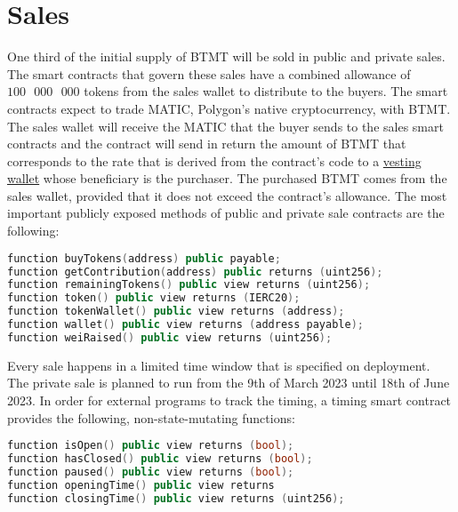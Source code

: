 \documentclass[a4paper,12pt]{article}
\begin{document}
\section{Sales}

One third of the initial supply of BTMT will be sold in public and private sales.
The smart contracts that govern these sales have a combined allowance
of $100\text{ }000\text{ }000$ tokens from the sales wallet to distribute to the buyers.
The smart contracts expect to trade MATIC, Polygon's native cryptocurrency, with BTMT.
The sales wallet will receive the MATIC that the buyer sends to the sales
smart contracts and the contract will send in return the amount of BTMT that
corresponds to the rate that is derived from the contract's code to a \href{https://github.com/OpenZeppelin/openzeppelin-contracts/blob/master/contracts/finance/VestingWallet.sol}{vesting wallet} whose beneficiary is the purchaser. The purchased BTMT comes from the sales wallet,
provided that it does not exceed the contract's allowance.
The most important publicly exposed methods of public and private
sale contracts
are the following:

\begin{lstlisting}[language=C++, caption=Solidity sale function signatures]
function buyTokens(address) public payable;
function getContribution(address) public returns (uint256);
function remainingTokens() public view returns (uint256);
function token() public view returns (IERC20);
function tokenWallet() public view returns (address);
function wallet() public view returns (address payable);
function weiRaised() public view returns (uint256);
\end{lstlisting}

Every sale happens in a limited time window that is specified on deployment.
The private sale is planned to run from the 9th of March 2023 until 18th of June 2023.
In order for external programs to track the timing, a
timing smart contract
provides the following, non-state-mutating functions:
\begin{lstlisting}[language=C++, caption=Solidity timed sale function signatures]
function isOpen() public view returns (bool);
function hasClosed() public view returns (bool);
function paused() public view returns (bool);
function openingTime() public view returns
function closingTime() public view returns (uint256);
\end{lstlisting}
\end{document}
